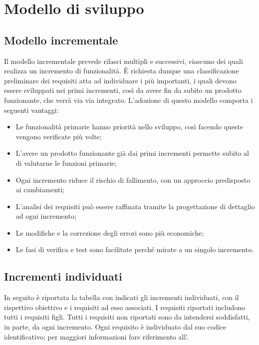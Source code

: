 \section{Modello di sviluppo}

\subsection{Modello incrementale}
Il modello incrementale prevede rilasci multipli e successivi, ciascuno dei quali realizza un incremento di funzionalità.
È richiesta dunque una classificazione preliminare dei requisiti atta ad individuare i più importanti, i quali devono essere sviluppati nei primi incrementi, così da avere fin da subito un prodotto funzionante, che verrà via via integrato.
L'adozione di questo modello comporta i seguenti vantaggi:
\begin{itemize}
\item Le funzionalità primarie hanno priorità nello sviluppo, così facendo queste vengono verificate più volte;
\item L'avere un prodotto funzionante già dai primi incrementi permette subito al  di valutarne le funzioni primarie;
\item Ogni incremento riduce il rischio di fallimento, con un approccio predisposto ai cambiamenti;
\item L'analisi dei requisiti può essere raffinata tramite la progettazione di dettaglio ad ogni incremento;
\item Le modifiche e la correzione degli errori sono più economiche;
\item Le fasi di verifica e test sono facilitate perché mirate a un singolo incremento.
\end{itemize}

\subsection{Incrementi individuati}
In seguito è riportata la tabella con indicati gli incrementi individuati, con il rispettivo obiettivo e i requisiti ad esso associati. 
I requisiti riportati includono tutti i requisiti figli. Tutti i requisiti non riportati sono da intendersi soddisfatti, in parte, da ogni incremento.
Ogni requisito è individuato dal suo codice identificativo; per maggiori informazioni fare riferimento all'\AdR{}.

